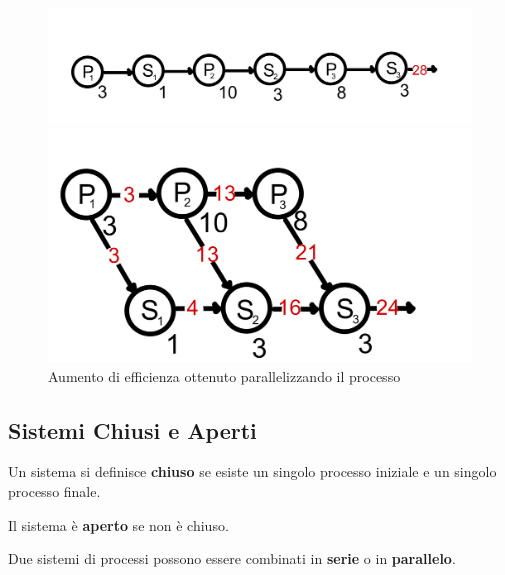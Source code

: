\begin{figure}[H]
    \centering
    \begin{minipage}{0.45\textwidth}
        \centering
        \includegraphics[width=\linewidth]{assets/threads-sequenziale.jpeg}
    \end{minipage}
    \hfill
    \begin{minipage}{0.35\textwidth}
        \centering
        \includegraphics[width=\linewidth]{assets/threads-parallelo.jpeg}
    \end{minipage}
    \caption{Aumento di efficienza ottenuto parallelizzando il processo}
\end{figure}

\subsection{Sistemi Chiusi e Aperti}

Un sistema si definisce \textbf{chiuso} se esiste un singolo processo iniziale e un singolo processo finale.

Il sistema è \textbf{aperto} se non è chiuso.

\spacer

Due sistemi di processi possono essere combinati in \textbf{serie} o in \textbf{parallelo}.


